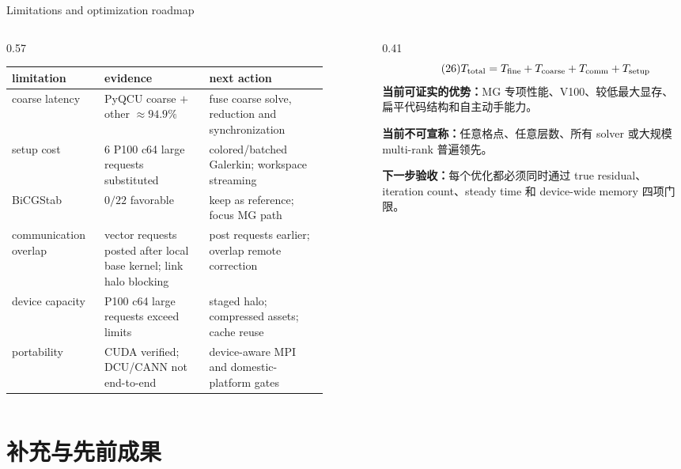 \documentclass[UTF8,aspectratio=169,11pt,fontset=none]{ctexbeamer}
\begin{document}
\begin{frame}[t,shrink=3]{Limitations and optimization roadmap}
\begin{columns}[T,totalwidth=\textwidth]
\begin{column}{0.57\textwidth}
  \footnotesize
  \begin{tabular}{@{}p{0.24\linewidth}p{0.30\linewidth}p{0.34\linewidth}@{}}
  \toprule
  limitation & evidence & next action\\
  \midrule
  coarse latency & PyQCU coarse \(+\) other \(\approx94.9\%\) & fuse coarse solve, reduction and synchronization\\
  setup cost & 6 P100 c64 large requests substituted & colored/batched Galerkin; workspace streaming\\
  BiCGStab & \(0/22\) favorable & keep as reference; focus MG path\\
  communication overlap & vector requests posted after local base kernel; link halo blocking & post requests earlier; overlap remote correction\\
  device capacity & P100 c64 large requests exceed limits & staged halo; compressed assets; cache reuse\\
  portability & CUDA verified; DCU/CANN not end-to-end & device-aware MPI and domestic-platform gates\\
  \bottomrule
  \end{tabular}
\end{column}
\begin{column}{0.41\textwidth}
  \begin{equation}\tag{26}
  T_{\rm total}
  =T_{\rm fine}+T_{\rm coarse}+T_{\rm comm}+T_{\rm setup}
  \end{equation}
  \small
  \textbf{当前可证实的优势：}MG 专项性能、V100、较低最大显存、
  扁平代码结构和自主动手能力。
  \par\vspace{0.35em}
  \textbf{当前不可宣称：}任意格点、任意层数、所有 solver 或大规模
  multi-rank 普遍领先。
  \par\vspace{0.35em}
  \textbf{下一步验收：}每个优化都必须同时通过 true residual、
  iteration count、steady time 和 device-wide memory 四项门限。
\end{column}
\end{columns}
\end{frame}

\section{补充与先前成果}
\end{document}
